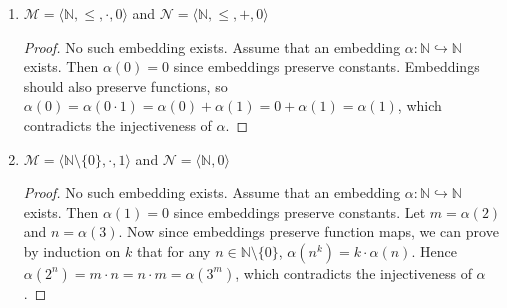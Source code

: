 \documentclass{article}
\begin{document}
\begin{enumerate}
\begin{enumerate}
      \item $\mathscr{M}=\langle\mathbb{N},\leq,\cdot,0\rangle$ and
        $\mathscr{N}=\langle\mathbb{N},\leq,+,0\rangle$
        \begin{proof}
          No such embedding exists. Assume that an embedding
          $\alpha:\mathbb{N}\hookrightarrow\mathbb{N}$ exists. Then
          $\alpha(0)=0$ since embeddings preserve constants. Embeddings
          should also preserve functions, so
          $\alpha(0)=\alpha(0\cdot1)=\alpha(0)+\alpha(1)=0+\alpha(1)=\alpha(1)$,
          which contradicts the injectiveness of $\alpha$.
        \end{proof}

      \item $\mathscr{M}=\langle\mathbb{N}\setminus\{0\},\cdot,1\rangle$ and
        $\mathscr{N}=\langle\mathbb{N},0\rangle$
        \begin{proof}
          No such embedding exists. Assume that an embedding
          $\alpha:\mathbb{N}\hookrightarrow\mathbb{N}$ exists. Then
          $\alpha(1)=0$ since embeddings preserve constants. Let
          $m=\alpha(2)$ and $n=\alpha(3)$. Now since embeddings preserve
          function maps, we can prove by induction on $k$ that for any
          $n\in\mathbb{N}\setminus\{0\}$, $\alpha(n^k)=k\cdot \alpha(n)$.
          Hence $\alpha(2^n)=m\cdot n=n\cdot m=\alpha(3^m)$,
          which contradicts the injectiveness of $\alpha$.
        \end{proof}
    \end{enumerate}
\end{enumerate}
\end{document}
